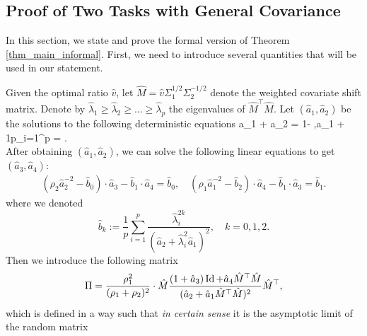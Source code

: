 \subsection{Proof of Two Tasks with General Covariance}\label{app_proof_main}


In this section, we state and prove the formal version of Theorem \ref{thm_main_informal}. First, we need to introduce several quantities that will be used in our statement.

Given the optimal ratio $\hat v$, let $\hat{M} = \hat{v} \Sigma_1^{1/2}\Sigma_2^{-1/2}$ denote the weighted covariate shift matrix. Denote by ${\hat\lambda}_1\ge {\hat\lambda}_2 \ge \dots \ge {\hat\lambda}_p$ the eigenvalues of $\hat{M}^{\top}\hat{M}$. Let $(\hat a_1, \hat a_2)$ be the solutions to the following deterministic equations
	\be
		 \hat a_1 +  \hat a_2 = 1- ,\quad  \hat a_1 + \cdot \frac1p\sum_{i=1}^p  = .\label{eq_a2} \\
		 \ee
		 After obtaining $(\hat a_1,\hat a_2)$, we can solve the following linear equations to get $(\hat a_3,\hat a_4)$:
\begin{gather}
		\left(\rho_2 \hat a_2^{-2}- \hat b_0\right)\cdot \hat  a_3 - \hat b_1 \cdot \hat a_4
		=\hat b_0, \quad \left(\rho_1\hat a_1^{-2} - \hat b_2  \right)\cdot \hat a_4 - \hat b_1 \cdot \hat a_3 =\hat b_1 .\label{eq_a3} 
	\end{gather}
where we denoted
$$\hat b_k:= \frac1{p}\sum_{i=1}^p \frac{\hat \lambda_i^{2k}}{ (\hat a_2 +\hat  \lambda_i^2\hat a_1)^2  },\quad k=0,1,2.$$
Then we introduce the following matrix
$$\Pi = \frac{\rho_1^2}{(\rho_1 + \rho_2)^2}\cdot{\hat M} \frac{(1 + \hat a_3)\operatorname{Id} +\hat  a_4 \hat {M}^{\top}\hat {M}}{(\hat a_2 +\hat  a_1 \hat {M}^{\top}\hat {M})^2} \hat {M}^{\top},$$
which is defined in a way such that {\it in certain sense} it is the asymptotic limit of the random matrix 
